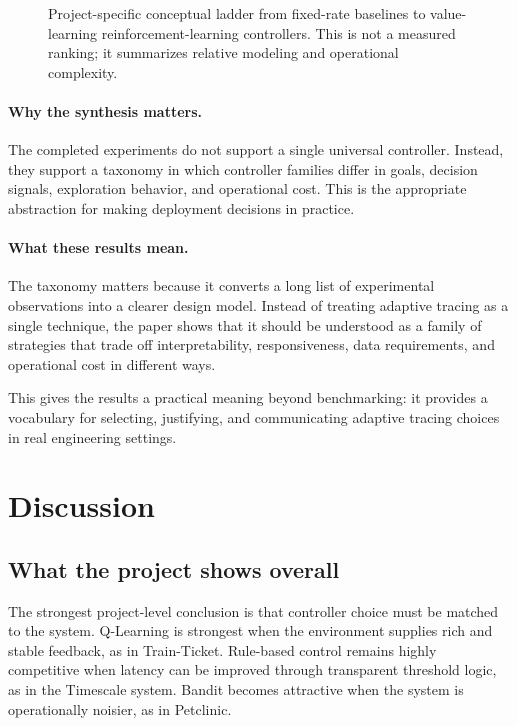 \documentclass[10pt,twocolumn]{article}
\begin{document}
\begin{figure}[t]
\centering
{}
\caption{Project-specific conceptual ladder from fixed-rate baselines to value-learning reinforcement-learning controllers. This is not a measured ranking; it summarizes relative modeling and operational complexity.}
\end{figure}

\paragraph{Why the synthesis matters.} The completed experiments do not support a single universal controller. Instead, they support a taxonomy in which controller families differ in goals, decision signals, exploration behavior, and operational cost. This is the appropriate abstraction for making deployment decisions in practice.

\paragraph{What these results mean.} The taxonomy matters because it converts a long list of experimental observations into a clearer design model. Instead of treating adaptive tracing as a single technique, the paper shows that it should be understood as a family of strategies that trade off interpretability, responsiveness, data requirements, and operational cost in different ways.

This gives the results a practical meaning beyond benchmarking: it provides a vocabulary for selecting, justifying, and communicating adaptive tracing choices in real engineering settings.
\FloatBarrier

\section{Discussion}
\subsection{What the project shows overall}
The strongest project-level conclusion is that controller choice must be matched to the system. Q-Learning is strongest when the environment supplies rich and stable feedback, as in Train-Ticket. Rule-based control remains highly competitive when latency can be improved through transparent threshold logic, as in the Timescale system. Bandit becomes attractive when the system is operationally noisier, as in Petclinic.
\end{document}
